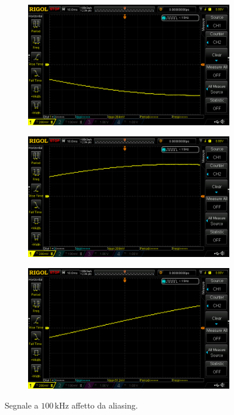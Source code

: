 \documentclass{article}
\begin{document}
				\begin{figure}[h!]
					\centering
					\begin{subfigure}{0.4\textwidth}
						\centering
						\includegraphics[scale=0.2]{aliasing100kHz_1}
					\end{subfigure}
					\begin{subfigure}{0.4\textwidth}
						\centering
						\includegraphics[scale=0.2]{aliasing100kHz_2}
					\end{subfigure}
					\newline
					\centering
					\begin{subfigure}{0.4\textwidth}
						\centering
						\includegraphics[scale=0.2]{aliasing100kHz_3}
					\end{subfigure}
					\caption{Segnale a $ 100 \, \mathrm{kHz} $ affetto da aliasing.}
					\label{fig:aliasing100kHz}
				\end{figure}
\end{document}
